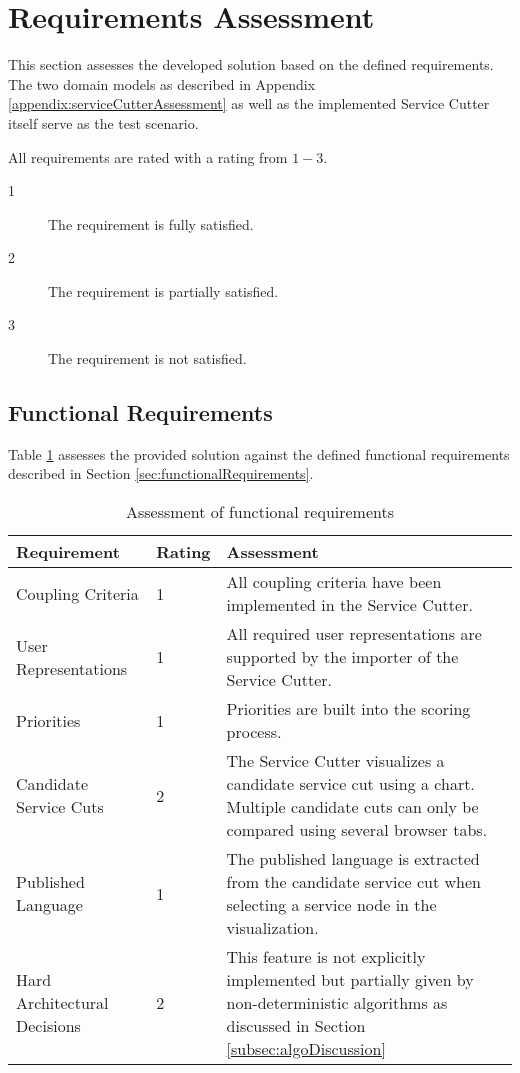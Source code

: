 \section{Requirements Assessment}

This section assesses the developed solution based on the defined requirements. The two domain models as described in Appendix \ref{appendix:serviceCutterAssessment} as well as the implemented Service Cutter itself serve as the test scenario.

All requirements are rated with a rating from $1-3$.

\begin{description}
\item[1] The requirement is fully satisfied.
\item[2] The requirement is partially satisfied.
\item[3] The requirement is not satisfied.
\end{description}

\subsection{Functional Requirements}

Table \ref{tab:conclusionFunctional} assesses the provided solution against the defined functional requirements described in Section \ref{sec:functionalRequirements}.

\begin{table}[H]
	\centering
	\caption{Assessment of functional requirements}
	\label{tab:conclusionFunctional}
	\begin{tabular}{|p{100pt}|l|p{250pt}|}
	\hline \textbf{Requirement} & \textbf{Rating} & \textbf{Assessment} \\ 
	\hline Coupling Criteria & 1 & All coupling criteria have been implemented in the Service Cutter.  \\ %
	\hline User Representations & 1 & All required user representations are supported by the importer of the Service Cutter. \\ 
	\hline Priorities & 1 & Priorities are built into the scoring process. \\ 
	\hline Candidate Service Cuts & 2 & The Service Cutter visualizes a candidate service cut using a chart. Multiple candidate cuts can only be compared using several browser tabs. \\ 
	\hline Published Language & 1 & The published language is extracted from the candidate service cut when selecting a service node in the visualization.  \\ 
	\hline Hard Architectural Decisions & 2 & This feature is not explicitly implemented but partially given by non-deterministic algorithms as discussed in Section \ref{subsec:algoDiscussion}\\
	\hline 
	\end{tabular} 
\end{table}

